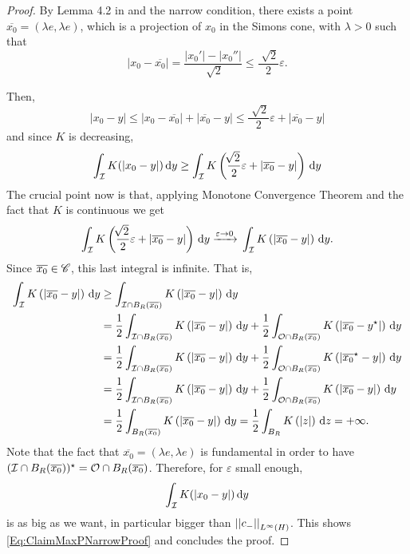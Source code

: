\begin{proof}
    By Lemma 4.2 in \cite{CabreTerraI} and the narrow condition, there exists a point $\overline{x_0}=(\lambda e, \lambda e)$, which is a projection of $x_0$ in the Simons cone, with $\lambda>0$ such that
    $$ |x_0-\overline{x_0}| = \frac{|x_0'|-|x_0''|}{\sqrt[]{2}} \leq \frac{\sqrt[]{2}}{2} \varepsilon. $$
	
	Then,
	$$
	|x_0 - y| \leq |x_0 - \overline{x_0}| + |\overline{x_0} - y| \leq \frac{\sqrt[]{2}}{2} \varepsilon + |\overline{x_0} - y|
	$$
	and since $K$ is decreasing,
	$$
	\int_{\mathcal{I}} K(|x_0 - y|)\,\mathrm{d} y \geq
	\int_{\mathcal{I}} K\left(\frac{\sqrt[]{2}}{2} \varepsilon + |\overline{x_0} - y|\right)\,\mathrm{d} y
	$$
	The crucial point now is that, applying Monotone Convergence Theorem and the fact that $K$ is continuous we get 
	$$
	\int_{\mathcal{I}} K\left(\frac{\sqrt[]{2}}{2} \varepsilon + |\overline{x_0} - y|\right)\,\mathrm{d} y \xrightarrow{\varepsilon\to 0}{} \int_{\mathcal{I}} K\left(|\overline{x_0} - y|\right)\,\mathrm{d} y.
	$$
	Since $\overline{x_0} \in \mathscr{C}$, this last integral is infinite. That is,
    \begin{align*}
    \int_{\mathcal{I}} K\left(|\overline{x_0} - y|\right)\,\mathrm{d} y &\geq \int_{\mathcal{I}\cap B_R(\overline{x_0})} K\left(|\overline{x_0} - y|\right)\,\mathrm{d} y \\
    &= \frac{1}{2}\int_{\mathcal{I}\cap B_R(\overline{x_0})} K\left(|\overline{x_0} - y|\right)\,\mathrm{d} y + \frac{1}{2}\int_{\mathcal{O}\cap B_R(\overline{x_0})} K\left(|\overline{x_0} - y^\star|\right)\,\mathrm{d} y\\
    &= \frac{1}{2}\int_{\mathcal{I}\cap B_R(\overline{x_0})} K\left(|\overline{x_0} - y|\right)\,\mathrm{d} y + \frac{1}{2}\int_{\mathcal{O}\cap B_R(\overline{x_0})} K\left(|\overline{x_0}^\star - y|\right)\,\mathrm{d} y\\
    &= \frac{1}{2}\int_{\mathcal{I}\cap B_R(\overline{x_0})} K\left(|\overline{x_0} - y|\right)\,\mathrm{d} y + \frac{1}{2}\int_{\mathcal{O}\cap B_R(\overline{x_0})} K\left(|\overline{x_0} - y|\right)\,\mathrm{d} y\\
    &= \frac{1}{2}\int_{B_R(\overline{x_0})} K\left(|\overline{x_0} - y|\right)\,\mathrm{d} y = \frac{1}{2}\int_{B_R} K\left(|z|\right)\,\mathrm{d} z = +\infty.
    \end{align*}
    Note that the fact that $\overline{x_0} = (\lambda e, \lambda e)$ is fundamental in order to have $(\mathcal{I}\cap B_R(\overline{x_0}))^\star = \mathcal{O}\cap B_R(\overline{x_0})$. Therefore, for $\varepsilon$ small enough,  
	$$
	\int_{\mathcal{I}} K(|x_0 - y|)\,\mathrm{d} y
	$$
	is as big as we want, in particular bigger than $\left | \left |{c_-} \right | \right |_{L^\infty(H)}$. This shows \eqref{Eq:ClaimMaxPNarrowProof} and concludes the proof.
\end{proof}

